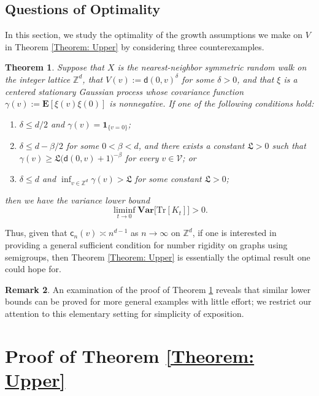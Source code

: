 \documentclass{amsart}
\numberwithin{equation}{section}
\newtheorem{theorem}{Theorem}[section]
\theoremstyle{definition}
\newtheorem{remark}[theorem]{Remark}
\newcommand\be{\beta}
\newcommand\de{\delta}
\newcommand\ga{\gamma}
\newcommand\mbb{\mathbb}
\newcommand\mbf{\mathbf}
\newcommand\mf{\mathfrak}
\newcommand\mr{\mathrm}
\newcommand\ms{\mathscr}
\newcommand\msf{\mathsf}
\begin{document}
%

\subsection{Questions of Optimality}
\label{Section: Optimality}

%

In this section, we study the optimality of the growth assumptions
we make on $V$ in Theorem \ref{Theorem: Upper} by considering three
counterexamples.

%

\begin{theorem}\label{Theorem: Lower}
Suppose that $X$ is the nearest-neighbor symmetric random walk on the integer lattice $\mbb Z^d$,
that $V(v):=\msf d(0,v)^\de$ for some $\de>0$, and that $\xi$ is a centered stationary Gaussian
process whose covariance function $\ga(v):=\mbf E[\xi(v)\xi(0)]$ is nonnegative.
If one of the following conditions hold:
\begin{enumerate}
\item $\de\leq d/2$ and $\ga(v)=\mbf 1_{\{v=0\}}$;
\item $\de\leq d-\be/2$ for some $0<\be<d$, and there exists a constant $\mf L>0$
such that $\ga(v)\geq\mf L\big(\msf d(0,v)+1\big)^{-\be}$ for every $v\in\ms V$; or
\item $\de\leq d$ and $\inf_{v\in\mbb Z^d}\ga(v)>\mf L$ for some constant $\mf L>0$;
\end{enumerate}
then we have the variance lower bound
\[\liminf_{t\to0}\mbf{Var}\big[\mr{Tr}[K_t]\big]>0.\]
\end{theorem}

%

Thus, given that $\msf c_n(v)\asymp n^{d-1}$ as $n\to\infty$ on $\mbb Z^d$,
if one is interested in providing a general sufficient condition for number rigidity on graphs
using semigroups, then Theorem \ref{Theorem: Upper} is essentially the optimal result
one could hope for. 

%

\begin{remark}
An examination of the proof of Theorem \ref{Theorem: Lower}
reveals that similar lower bounds can be proved for more general
examples with little effort; we restrict our attention to this elementary setting for
simplicity of exposition.
\end{remark}

%

\section{Proof of Theorem \ref{Theorem: Upper}}
\label{sec: Proof of Upper}
\end{document}
